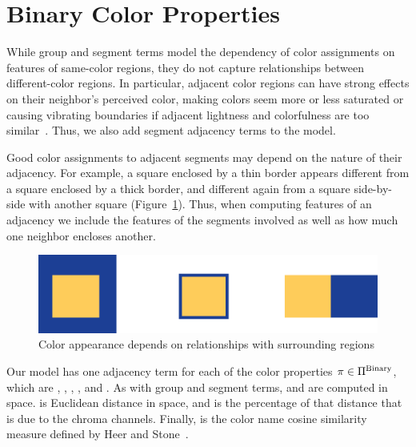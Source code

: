 \section{Binary Color Properties}
\label{sec:binary}

While group and segment terms model the dependency of color assignments on features of same-color regions, they do not capture relationships between different-color regions. In particular, adjacent color regions can have strong effects on their neighbor's perceived color, making colors seem more or less saturated or causing vibrating boundaries if adjacent lightness and colorfulness are too similar~\cite{AlbersInteractionOfColor}. Thus, we also add segment adjacency terms to the model.

Good color assignments to adjacent segments may depend on the nature of their adjacency. For example, a square enclosed by a thin border appears different from a square enclosed by a thick border, and different again from a square side-by-side with another square (Figure~\ref{fig:surround}). Thus, when computing features of an adjacency we include the features of the segments involved as well as how much one neighbor encloses another.
\begin{figure}[ht]
\centering
\includegraphics[width=.7\columnwidth]{figs/surround}
\caption{Color appearance depends on relationships with surrounding regions}
\label{fig:surround}
\end{figure}


Our model has one adjacency term for each of the color properties $ \pi \in \Pi^{\textrm{Binary}}$, which are , , , , and .
As with group and segment terms,  and  are computed in \lab space.  is Euclidean distance in \lab space, and  is the percentage of that distance that is due to the chroma channels. Finally,  is the color name cosine similarity measure defined by Heer and Stone~.

